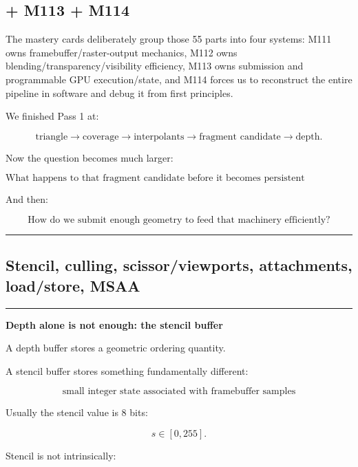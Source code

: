 \subsection{+ M113 + M114}\label{03-visual-computing-i-ch013-m113-m114}

The mastery cards deliberately group those 55 parts into four systems: M111 owns framebuffer/raster-output mechanics, M112 owns blending/transparency/visibility efficiency, M113 owns submission and programmable GPU execution/state, and M114 forces us to reconstruct the entire pipeline in software and debug it from first principles.

We finished Pass 1 at:

\[
\text{triangle}
\rightarrow
\text{coverage}
\rightarrow
\text{interpolants}
\rightarrow
\text{fragment candidate}
\rightarrow
\text{depth}.
\]

Now the question becomes much larger:

\[
\boxed{
\text{What happens to that fragment candidate before it becomes persistent framebuffer state?}
}
\]

And then:

\[
\boxed{
\text{How do we submit enough geometry to feed that machinery efficiently?}
}
\]

\begin{center}\rule{0.5\linewidth}{0.5pt}\end{center}

\subsection{Stencil, culling, scissor/viewports, attachments, load/store, MSAA}\label{03-visual-computing-i-ch013-stencil-culling-scissorviewports-attachments-loadstore-msaa}

\begin{center}\rule{0.5\linewidth}{0.5pt}\end{center}

\textbf{Depth alone is not enough: the stencil buffer}

A depth buffer stores a geometric ordering quantity.

A stencil buffer stores something fundamentally different:

\[
\boxed{\text{small integer state associated with framebuffer samples}}
\]

Usually the stencil value is 8 bits:

\[
s\in[0,255].
\]

Stencil is not intrinsically:

